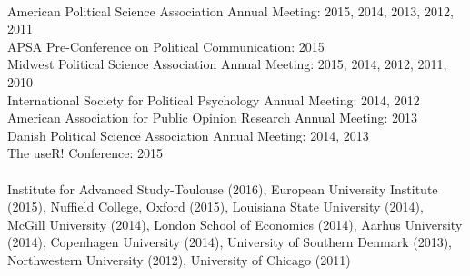 \documentclass[12pt]{article}
\renewcommand{\section}[1]{\pagebreak[3]%
    \llap{\scshape\smash{\parbox[t]{\marginparwidth}{\raggedright {\color{lg}#1}}}}%
    \vspace{-\baselineskip}\par}
\newcommand{\topic}[1]{\pagebreak[3]\indent {\color{lg}{\footnotesize #1 }}\\}
\newcommand{\entry}[1]{\indent {\color{lg}\guillemotright}\hspace{2pt}#1\vspace{.25em}\\}
\begin{document}
\section{Conference\\Papers\\and\\Invited\\Presentations}
\topic{Conference Papers}
\entry{American Political Science Association Annual Meeting: 2015, 2014, 2013, 2012, 2011}
\entry{APSA Pre-Conference on Political Communication: 2015}
\entry{Midwest Political Science Association Annual Meeting: 2015, 2014, 2012, 2011, 2010}
\entry{International Society for Political Psychology Annual Meeting: 2014, 2012}
\entry{American Association for Public Opinion Research Annual Meeting: 2013}
\entry{Danish Political Science Association Annual Meeting: 2014, 2013}
\entry{The useR! Conference: 2015}

\topic{Invited Presentations}
\entry{Institute for Advanced Study-Toulouse (2016), European University Institute (2015), Nuffield College, Oxford (2015), Louisiana State University (2014), McGill University (2014), London School of Economics (2014), Aarhus University (2014), Copenhagen University (2014), University of Southern Denmark (2013), Northwestern University (2012), University of Chicago (2011)}

\end{document}
